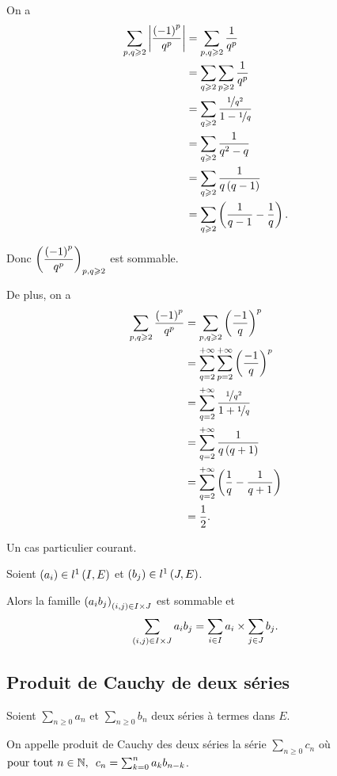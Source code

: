 \begin{corr}
On a \[\begin{aligned}
\sum_{p,q\geqslant2}\left\lvert\dfrac{\left(-1\right)^p}{q^p}\right\rvert&=\sum_{p,q\geqslant2}\dfrac{1}{q^p} \\
&=\sum_{q\geqslant2}\sum_{p\geqslant2}\dfrac{1}{q^p} \\
&=\sum_{q\geqslant2}\dfrac{\nicefrac{1}{q^2}}{1-\nicefrac{1}{q}} \\
&=\sum_{q\geqslant2}\dfrac{1}{q^2-q} \\
&=\sum_{q\geqslant2}\dfrac{1}{q\left(q-1\right)} \\
&=\sum_{q\geqslant2}\left(\dfrac{1}{q-1}-\dfrac{1}{q}\right).
\end{aligned}\]

Donc \(\left(\dfrac{\left(-1\right)^p}{q^p}\right)_{p,q\geqslant2}\) est sommable.

De plus, on a \[\begin{aligned}
\sum_{p,q\geqslant2}\dfrac{\left(-1\right)^p}{q^p}&=\sum_{p,q\geqslant2}\left(\dfrac{-1}{q}\right)^p \\
&=\sum_{q=2}^{+\infty}\sum_{p=2}^{+\infty}\left(\dfrac{-1}{q}\right)^p \\
&=\sum_{q=2}^{+\infty}\dfrac{\nicefrac{1}{q^2}}{1+\nicefrac{1}{q}} \\
&=\sum_{q=2}^{+\infty}\dfrac{1}{q\left(q+1\right)} \\
&=\sum_{q=2}^{+\infty}\left(\dfrac{1}{q}-\dfrac{1}{q+1}\right) \\
&=\dfrac{1}{2}.
\end{aligned}\]
\end{corr}

Un cas particulier courant.

\begin{prop}
Soient \(\left(a_i\right)\in l^1\left(I,E\right)\) et \(\left(b_j\right)\in l^1\left(J,E\right)\).

Alors la famille \(\left(a_ib_j\right)_{\left(i,j\right)\in I\times J}\) est sommable et \[\sum_{\left(i,j\right)\in I\times J}a_ib_j=\sum_{i\in I}a_i\times\sum_{j\in J}b_j.\]
\end{prop}

\subsection{Produit de Cauchy de deux séries}

\begin{defi}
Soient \(\sum_{n\geq0}a_n\) et \(\sum_{n\geq0}b_n\) deux séries à termes dans \(E\).

On appelle produit de Cauchy des deux séries la série \(\sum_{n\geq0}c_n\) où \(\quantifs{\tpt n\in\N}c_n=\sum_{k=0}^na_kb_{n-k}\).
\end{defi}

